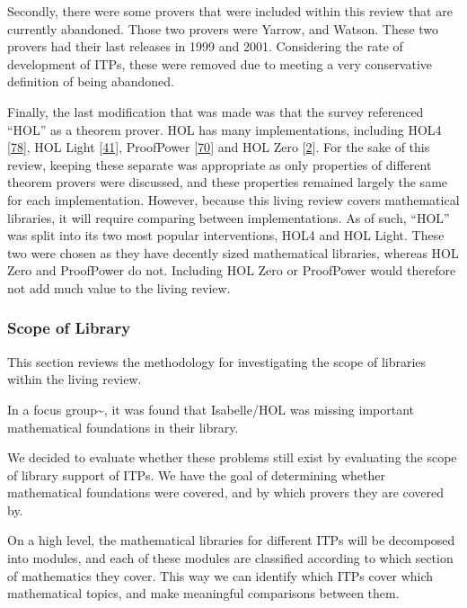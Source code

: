 \documentclass[
]{article}
\begin{document}
Secondly, there were some provers that were included within this review
that are currently abandoned. Those two provers were Yarrow, and Watson.
These two provers had their last releases in 1999 and 2001. Considering
the rate of development of ITPs, these were removed due to meeting a
very conservative definition of being abandoned.

Finally, the last modification that was made was that the survey
referenced ``HOL'' as a theorem prover. HOL has many implementations,
including HOL4 {[}\protect\hyperlink{ref-HOL4}{78}{]}, HOL Light
{[}\protect\hyperlink{ref-HOL_Light}{41}{]}, ProofPower
{[}\protect\hyperlink{ref-ProofPower}{70}{]} and HOL Zero
{[}\protect\hyperlink{ref-HOL_Zero}{2}{]}. For the sake of this review,
keeping these separate was appropriate as only properties of different
theorem provers were discussed, and these properties remained largely
the same for each implementation. However, because this living review
covers mathematical libraries, it will require comparing between
implementations. As of such, ``HOL'' was split into its two most popular
interventions, HOL4 and HOL Light. These two were chosen as they have
decently sized mathematical libraries, whereas HOL Zero and ProofPower
do not. Including HOL Zero or ProofPower would therefore not add much
value to the living review.

\hypertarget{sec:scope_of_library_meth}{%
\subsubsection{Scope of Library}\label{sec:scope_of_library_meth}}

This section reviews the methodology for investigating the scope of
libraries within the living review.

In a focus group\textasciitilde{}\cite{beckert_usability_2015}, it was
found that Isabelle/HOL was missing important mathematical foundations
in their library.

We decided to evaluate whether these problems still exist by evaluating
the scope of library support of ITPs. We have the goal of determining
whether mathematical foundations were covered, and by which provers they
are covered by.

On a high level, the mathematical libraries for different ITPs will be
decomposed into modules, and each of these modules are classified
according to which section of mathematics they cover. This way we can
identify which ITPs cover which mathematical topics, and make meaningful
comparisons between them.
\end{document}
